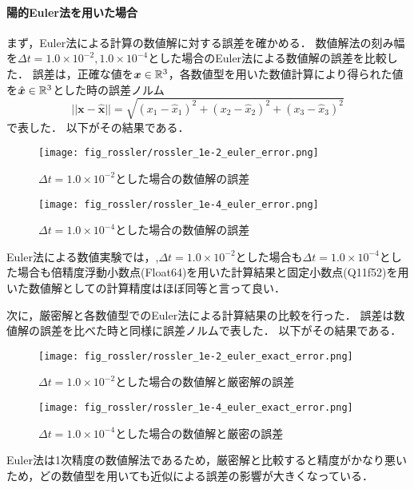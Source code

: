 \paragraph*{陽的Euler法を用いた場合}
まず，Euler法による計算の数値解に対する誤差を確かめる．
数値解法の刻み幅を$\Delta t = 1.0 \times 10^{-2},1.0 \times 10^{-4}$とした場合のEuler法による数値解の誤差を比較した．
誤差は，正確な値を$\bm{x} \in \mathbb{R}^3$，各数値型を用いた数値計算により得られた値を$\hat{\bm{x}} \in \mathbb{R}^3$とした時の誤差ノルム
\begin{equation}
    ||\bm{x} - \hat{\bm{x}}|| = \sqrt{(x_1 - \hat{x}_1)^2 + (x_2 - \hat{x}_2)^2 + (x_3 - \hat{x}_3)^2}
\end{equation}
で表した．
以下がその結果である．
\begin{figure}[H]
    \centering
    \begin{minipage}[b]{0.49\columnwidth}
        \centering
        \texttt{[image: fig\_rossler/rossler\_1e-2\_euler\_error.png]}
        \caption{$\Delta t = 1.0 \times 10^{-2}$とした場合の数値解の誤差}
        \label{fig:rossler_1e-2_euler_error}
    \end{minipage}
    \begin{minipage}[b]{0.49\columnwidth}
        \centering
        \texttt{[image: fig\_rossler/rossler\_1e-4\_euler\_error.png]}
        \caption{$\Delta t = 1.0 \times 10^{-4}$とした場合の数値解の誤差}
        \label{fig:rossler_1e-4_euler_error}
    \end{minipage}
\end{figure} 
Euler法による数値実験では，,$\Delta t = 1.0 \times 10^{-2}$とした場合も$\Delta t = 1.0 \times 10^{-4}$とした場合も倍精度浮動小数点(Float64)を用いた計算結果と固定小数点(Q11f52)を用いた数値解としての計算精度はほぼ同等と言って良い．


次に，厳密解と各数値型でのEuler法による計算結果の比較を行った．
誤差は数値解の誤差を比べた時と同様に誤差ノルムで表した．
以下がその結果である．\\
\begin{figure}[H]
    \centering
    \begin{minipage}[b]{0.49\columnwidth}
        \centering
        \texttt{[image: fig\_rossler/rossler\_1e-2\_euler\_exact\_error.png]}
        \caption{$\Delta t = 1.0 \times 10^{-2}$とした場合の数値解と厳密解の誤差}
        \label{fig:rossler_1e-2_eluer_exact_error}
    \end{minipage}
    \begin{minipage}[b]{0.49\columnwidth}
        \centering
        \texttt{[image: fig\_rossler/rossler\_1e-4\_euler\_exact\_error.png]}
        \caption{$\Delta t = 1.0 \times 10^{-4}$とした場合の数値解と厳密の誤差}
        \label{fig:rossler_1e-4_euler_exact_error}
    \end{minipage}
\end{figure}
Euler法は1次精度の数値解法であるため，厳密解と比較すると精度がかなり悪いため，どの数値型を用いても近似による誤差の影響が大きくなっている．

